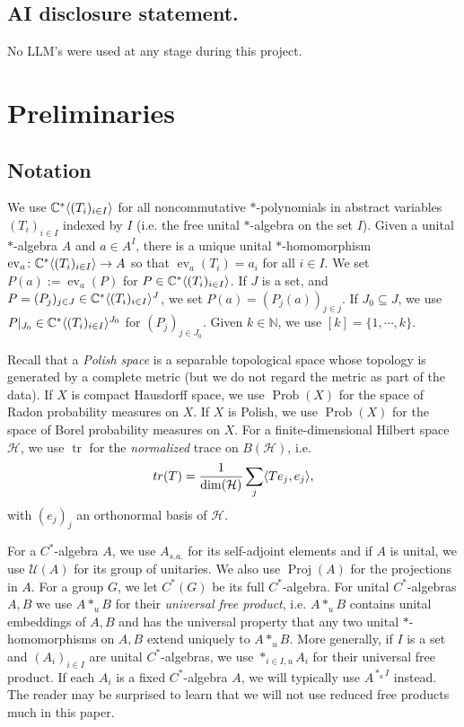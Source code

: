 \documentclass[10pt]{amsart}
\theoremstyle{definition}
\numberwithin{equation}{section}
\newcommand{\bC}{{\mathbb C}}
\newcommand{\bN}{{\mathbb N}}
\newcommand{\cH}{{\mathcal H}}
\newcommand{\cU}{{\mathcal U}}
\DeclareMathOperator{\tr}{tr}
\DeclareMathOperator{\ev}{ev}
\DeclareMathOperator{\Prob}{Prob}
\DeclareMathOperator{\Proj}{Proj}
\DeclarePairedDelimiter{\ip}{\langle}{\rangle}
\begin{document}
\subsection*{AI disclosure statement.} No LLM's were used at any stage during this project. 


\tableofcontents

\section{Preliminaries}

\subsection{Notation}
We use $\bC^{*}\ip{(T_{i})_{i\in I}}$ for all noncommutative $*$-polynomials in abstract variables $(T_{i})_{i\in I}$ indexed  by $I$ (i.e. the free unital $*$-algebra on the set $I$). 
Given a unital $*$-algebra $A$ and $a\in A^{I}$, there is a unique unital $*$-homomorphism $\ev_{a}\colon \bC^{*}\ip{(T_{i})_{i\in I}}\to A$ so that $\ev_{a}(T_{i})=a_{i}$ for all $i\in I$. We set $P(a):=\ev_{a}(P)$ for $P\in \bC^{*}\ip{(T_{i})_{i\in I}}$. 
If $J$ is a set, and $P=(P_{j})_{j\in J}\in \bC^{*}\ip{(T_{i})_{i\in I}}^{J}$, we set $P(a)=(P_{j}(a))_{j\in j}$. If $J_{0}\subseteq J$, we use $P|_{J_{0}}\in \bC^{*}\ip{(T_{i})_{i\in I}}^{J_{0}}$ for $(P_{j})_{j\in J_{0}}$. Given $k\in \bN$, we use $[k]=\{1,\cdots,k\}$. 

 Recall that a \emph{Polish space} is a separable topological space whose topology is generated by a complete metric (but we do not regard the metric as part of the data). If $X$ is compact Hausdorff space, we use $\Prob(X)$ for the space of Radon probability measures on $X$. If $X$ is Polish, we use $\Prob(X)$ for the space of Borel probability measures on $X$. For a finite-dimensional Hilbert space $\cH$, we use $\tr$ for the \emph{normalized} trace on $B(\cH)$, i.e.
\[tr(T)=\frac{1}{\dim(\cH)}\sum_{j}\ip{Te_{j},e_{j}},\]
with $(e_{j})_{j}$ an orthonormal basis of $\cH$. 

For a $C^{*}$-algebra $A$, we use $A_{s.a.}$ for its self-adjoint elements and if $A$ is unital, we use $\cU(A)$ for its group of unitaries. We also use $\Proj(A)$ for the projections in $A$.
For a group $G$, we let $C^{*}(G)$ be its full $C^{*}$-algebra.
For unital $C^{*}$-algebras $A,B$ we use $A*_{u}B$ for their \emph{universal free product}, i.e. $A*_{u}B$ contains unital embeddings of $A,B$ and has the universal property that any two unital $*$-homomorphisms on $A,B$ extend uniquely to $A*_{u}B$. More generally, if $I$ is a set and $(A_{i})_{i\in I}$ are unital $C^{*}$-algebras, we use $*_{i\in I,u}A_{i}$ for their universal free product. If each $A_{i}$ is a fixed $C^{*}$-algebra $A$, we will typically use $A^{*_{u}I}$ instead. The reader may be surprised to learn that we will not use reduced free products much in this paper. 
\end{document}
